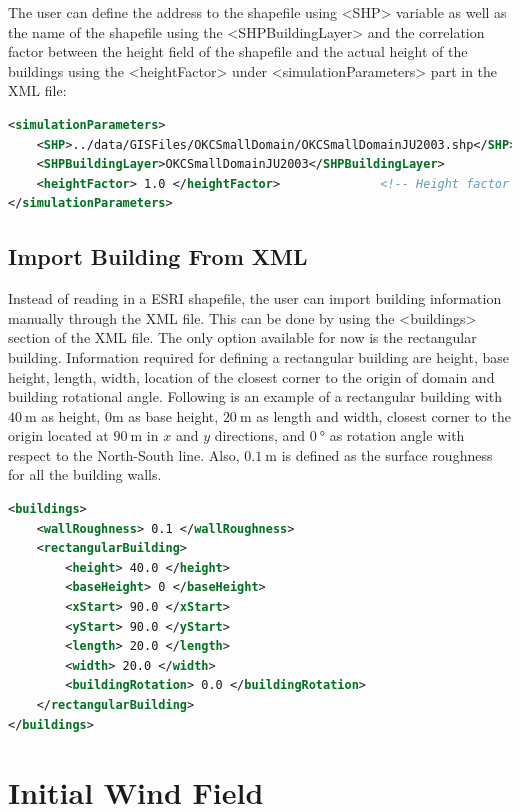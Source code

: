 The user can define the address to the shapefile using <SHP> variable as well as the name of the shapefile using the <SHPBuildingLayer> and the correlation factor between the height field of the shapefile and the actual height of the buildings using the <heightFactor> under <simulationParameters> part in the XML file:

\begin{lstlisting}[language=XML]
<simulationParameters>
  	<SHP>../data/GISFiles/OKCSmallDomain/OKCSmallDomainJU2003.shp</SHP>	<!-- Address to shapefile location-->
  	<SHPBuildingLayer>OKCSmallDomainJU2003</SHPBuildingLayer>
  	<heightFactor> 1.0 </heightFactor>				<!-- Height factor multiplied by the building height read in from the shapefile (default = 1.0)-->
</simulationParameters>
\end{lstlisting}

\subsection{Import Building From XML}
\label{sec:building}

Instead of reading in a ESRI shapefile, the user can import building information manually through the XML file. This can be done by using the <buildings> section of the XML file. The only option available for now is the rectangular building. Information required for defining a rectangular building are height, base height, length, width, location of the closest corner to the origin of domain and building rotational angle. Following is an example of a rectangular building with $40\ \si{\metre}$ as height, $0\si{\metre}$ as base height, $20\ \si{\metre}$ as length and width, closest corner to the origin located at $90\ \si{\metre}$ in $x$ and $y$ directions, and $0\ \si{\degree}$ as rotation angle with respect to the North-South line. Also, $0.1\ \si{\metre}$ is defined as the surface roughness for all the building walls.

\begin{lstlisting}[language=XML]
<buildings>
	<wallRoughness> 0.1 </wallRoughness>
	<rectangularBuilding>
		<height> 40.0 </height>
		<baseHeight> 0 </baseHeight>
		<xStart> 90.0 </xStart>
		<yStart> 90.0 </yStart>
		<length> 20.0 </length>
		<width> 20.0 </width>
		<buildingRotation> 0.0 </buildingRotation>
	</rectangularBuilding>
</buildings>
\end{lstlisting}

\section{Initial Wind Field}


